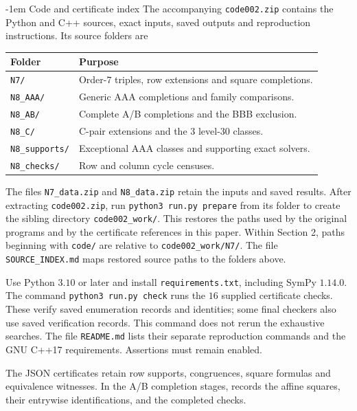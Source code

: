 \documentclass[11pt,a4paper]{article}
\makeatletter
\theoremstyle{plain}
\theoremstyle{definition}
\numberwithin{equation}{section}
\renewcommand\subsection{\@startsection{subsection}{2}{\z@}  {\medskipamount}  {-1em}  {\normalfont\normalsize\bfseries}}
\makeatother
\begin{document}
\subsection{Code and certificate index}\label{app:repro}
The accompanying \texttt{code002.zip} contains the Python and C++ sources, exact inputs, saved outputs and reproduction instructions. Its source folders are
\begin{center}\small\begin{tabular}{@{}ll@{}}\toprule
Folder & Purpose\\\midrule
\texttt{N7/} & Order-$7$ triples, row extensions and square completions.\\
\texttt{N8\_AAA/} & Generic AAA completions and family comparisons.\\
\texttt{N8\_AB/} & Complete A/B completions and the BBB exclusion.\\
\texttt{N8\_C/} & C-pair extensions and the $3$ level-$30$ classes.\\
\texttt{N8\_supports/} & Exceptional AAA classes and supporting exact solvers.\\
\texttt{N8\_checks/} & Row and column cycle censuses.\\
\bottomrule\end{tabular}\end{center}
The files \texttt{N7\_data.zip} and \texttt{N8\_data.zip} retain the inputs and saved results. After extracting \texttt{code002.zip}, run \texttt{python3 run.py prepare} from its folder to create the sibling directory \texttt{code002\_work/}. This restores the paths used by the original programs and by the certificate references in this paper. Within Section 2, paths beginning with \texttt{code/} are relative to \texttt{code002\_work/N7/}. The file \texttt{SOURCE\_INDEX.md} maps restored source paths to the folders above.

Use Python $3.10$ or later and install \texttt{requirements.txt}, including SymPy $1.14.0$. The command \texttt{python3 run.py check} runs the $16$ supplied certificate checks. These verify saved enumeration records and identities; some final checkers also use saved verification records. This command does not rerun the exhaustive searches. The file \texttt{README.md} lists their separate reproduction commands and the GNU C++17 requirements. Assertions must remain enabled.

The JSON certificates retain row supports, congruences, square formulas and equivalence witnesses. In the A/B completion stages,  records the affine squares,  their entrywise identifications, and  the completed checks.
\end{document}
